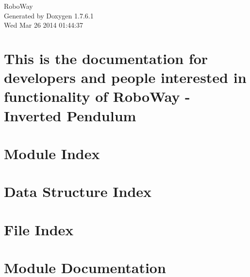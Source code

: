 \documentclass[a4paper]{book}
\begin{document}
\hypersetup{pageanchor=false,citecolor=blue}
\begin{titlepage}
\vspace*{7cm}
\begin{center}
{\Large \-Robo\-Way }\\
\vspace*{1cm}
{\large \-Generated by Doxygen 1.7.6.1}\\
\vspace*{0.5cm}
{\small Wed Mar 26 2014 01:44:37}\\
\end{center}
\end{titlepage}
\clearemptydoublepage
{}
\tableofcontents
\clearemptydoublepage
{}
\hypersetup{pageanchor=true,citecolor=blue}
\chapter{\-This is the documentation for developers and people interested in functionality of \-Robo\-Way -\/ \-Inverted \-Pendulum}
\label{index}\hypertarget{index}{}
\chapter{\-Module \-Index}

\chapter{\-Data \-Structure \-Index}

\chapter{\-File \-Index}

\chapter{\-Module \-Documentation}

























\end{document}
